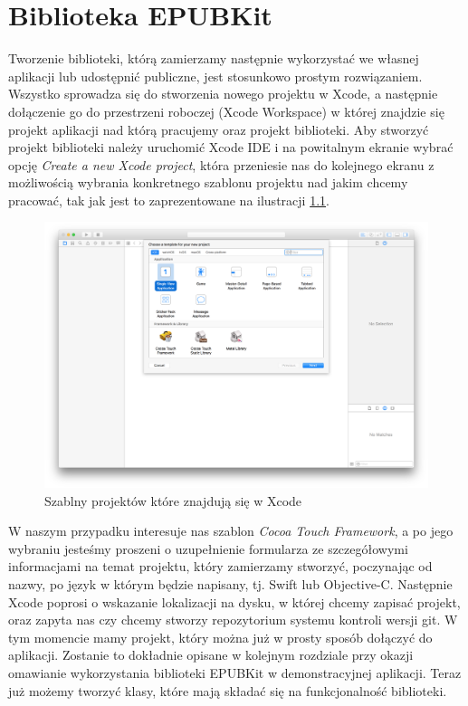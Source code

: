 \chapter{Biblioteka EPUBKit}

Tworzenie biblioteki, którą zamierzamy następnie wykorzystać we własnej aplikacji lub udostępnić publiczne, jest stosunkowo prostym rozwiązaniem. Wszystko sprowadza się do stworzenia nowego projektu w Xcode, a następnie dołączenie go do przestrzeni roboczej (Xcode Workspace) w której znajdzie się projekt aplikacji nad którą pracujemy oraz projekt biblioteki. Aby stworzyć projekt biblioteki należy uruchomić Xcode IDE i na powitalnym ekranie wybrać opcję \textit{Create a new Xcode project}, która przeniesie nas do kolejnego ekranu z możliwością wybrania konkretnego szablonu projektu nad jakim chcemy pracować, tak jak jest to zaprezentowane na ilustracji \ref{chapter-4-image-1-new-project}.

\begin{figure}[ht!]
  \centering
  \includegraphics[width=120mm]{images/chapter-4-image-1-new-project.png}
  \caption{Szablny projektów które znajdują się w Xcode}
  \label{chapter-4-image-1-new-project}
\end{figure}

W naszym przypadku interesuje nas szablon \textit{Cocoa Touch Framework}, a po jego wybraniu jesteśmy proszeni o uzupełnienie formularza ze szczegółowymi informacjami na temat projektu, który zamierzamy stworzyć, poczynając od nazwy, po język w którym będzie napisany, tj. Swift lub Objective-C. Następnie Xcode poprosi o wskazanie lokalizacji na dysku, w której chcemy zapisać projekt, oraz zapyta nas czy chcemy stworzy repozytorium systemu kontroli wersji git. W tym momencie mamy projekt, który można już w prosty sposób dołączyć do aplikacji. Zostanie to dokładnie opisane w kolejnym rozdziale przy okazji omawianie wykorzystania biblioteki EPUBKit w demonstracyjnej aplikacji. Teraz już możemy tworzyć klasy, które mają składać się na funkcjonalność biblioteki.

